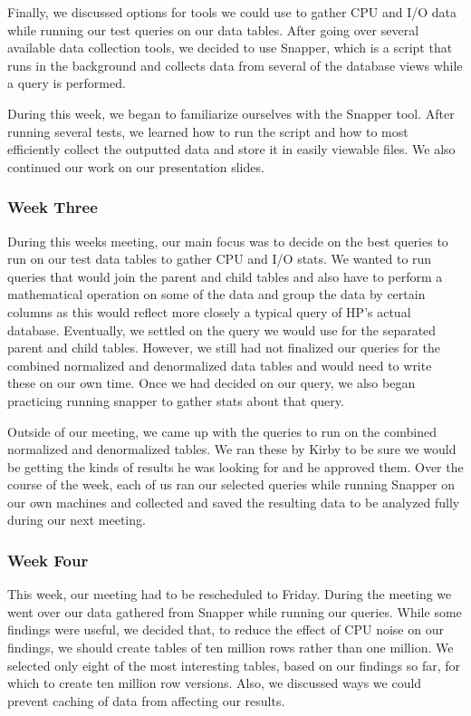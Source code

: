 \documentclass[10pt]{article}
\begin{document}
Finally, we discussed options for tools we could use to gather CPU and I/O data while running our test queries 
on our data tables. After going over several available data collection tools, we decided to use Snapper, which 
is a script that runs in the background and collects data from several of the database views while a query is 
performed. 

During this week, we began to familiarize ourselves with the Snapper tool. After running several tests, we 
learned how to run the script and how to most efficiently collect the outputted data and store it in easily 
viewable files. We also continued our work on our presentation slides.

\subsubsection{Week Three}
During this weeks meeting, our main focus was to decide on the best queries to run on our test data tables to 
gather CPU and I/O stats. We wanted to run queries that would join the parent and child tables and also have to 
perform a mathematical operation on some of the data and group the data by certain columns as this would reflect 
more closely a typical query of HP's actual database. Eventually, we settled on the query we would use for the 
separated parent and child tables. However, we still had not finalized our queries for the combined normalized 
and denormalized data tables and would need to write these on our own time. Once we had decided on our query, 
we also began practicing running snapper to gather stats about that query. 

Outside of our meeting, we came up with the queries to run on the combined normalized and denormalized tables. 
We ran these by Kirby to be sure we would be getting the kinds of results he was looking for and he approved 
them. Over the course of the week, each of us ran our selected queries while running Snapper on our own machines 
and collected and saved the resulting data to be analyzed fully during our next meeting. 

\subsubsection{Week Four}
This week, our meeting had to be rescheduled to Friday. During the meeting we went over our data gathered from 
Snapper while running our queries. While some findings were useful, we decided that, to reduce the effect of 
CPU noise on our findings, we should create tables of ten million rows rather than one million. 
We selected only eight of the most interesting tables, based on our findings so far, for which to create
ten million row versions. Also, we discussed ways we could prevent caching of data from affecting our results. 
\end{document}
